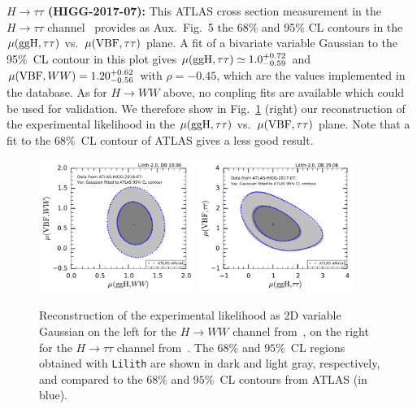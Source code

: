 
{\bf\boldmath $H\to \tau\tau$ (HIGG-2017-07):} This ATLAS cross section measurement in the $H\to \tau\tau$ channel~\cite{Aaboud:2018pen} 
provides as Aux.~Fig.~5 the 68\% and 95\% CL contours in the $\mu({\rm ggH}, \tau\tau)$ vs.\ $\mu({\rm VBF}, \tau\tau)$ plane. 
A fit of a bivariate variable Gaussian to the 95\%~CL contour in this plot  
gives $\mu({\rm ggH}, \tau\tau)\simeq 1.0^{+0.72}_{-0.59}$ and $\mu({\rm VBF}, WW)=1.20^{+0.62}_{-0.56}$ with 
$\rho = -0.45$, which are the values implemented in the database. 
As for $H\to WW$ above, no coupling fits are available which could be used for validation. 
We therefore show in Fig.~\ref{fig:validation_atlas_WW_tautau} (right) our reconstruction of the experimental likelihood in the 
$\mu({\rm ggH}, \tau\tau)$ vs.\ $\mu({\rm VBF}, \tau\tau)$ plane. 
Note that a fit to the 68\%~CL contour of ATLAS gives a less good result. \\

\begin{figure}[h!]\centering
\includegraphics[width=0.45\textwidth]{validation/ATLAS/HIGG-2016-07-mu-2d.pdf}%
\includegraphics[width=0.45\textwidth]{validation/ATLAS/HIGG-2017-07-mu-2d.pdf}
\caption{Reconstruction of the experimental likelihood as 2D variable Gaussian %
on the left for the $H\to WW$ channel from~\cite{Aaboud:2018jqu},
on the right for the $H\to \tau\tau$ channel from~\cite{Aaboud:2018pen}.  
The  $68\%$ and $95\%$~CL regions obtained with {\tt Lilith} are shown in dark and light gray, respectively, 
and compared to the $68\%$ and  $95\%$~CL contours from ATLAS (in blue).}
\label{fig:validation_atlas_WW_tautau}
\end{figure}


